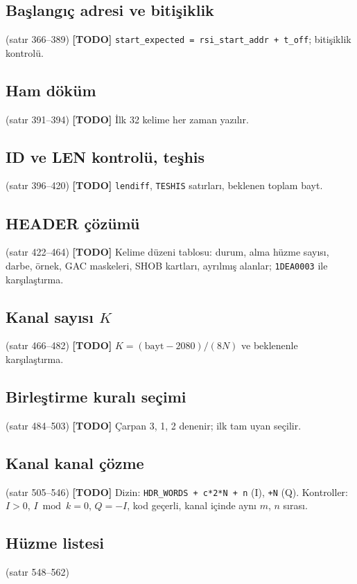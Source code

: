 \documentclass[11pt,a4paper]{article}
\newcommand{\kod}[1]{\texttt{#1}}
\newcommand{\todo}[1]{\textcolor{red!60!black}{\textbf{[TODO]} #1}}
\newcommand{\satir}[1]{\textcolor{black!60}{\scriptsize(satır #1)}}
\begin{document}
\subsection{Başlangıç adresi ve bitişiklik}
\satir{366--389} \todo{\kod{start\_expected = rsi\_start\_addr + t\_off}; bitişiklik
kontrolü.}

\subsection{Ham döküm}
\satir{391--394} \todo{İlk 32 kelime her zaman yazılır.}

\subsection{ID ve LEN kontrolü, teşhis}
\satir{396--420} \todo{\kod{lendiff}, \kod{TESHIS} satırları, beklenen toplam bayt.}

\subsection{HEADER çözümü}
\satir{422--464} \todo{Kelime düzeni tablosu: durum, alma hüzme sayısı, darbe,
örnek, GAC maskeleri, SHOB kartları, ayrılmış alanlar; \kod{1DEA0003} ile karşılaştırma.}

\subsection{Kanal sayısı $K$}
\satir{466--482} \todo{$K=(\text{bayt}-2080)/(8N)$ ve beklenenle karşılaştırma.}

\subsection{Birleştirme kuralı seçimi}
\satir{484--503} \todo{Çarpan 3, 1, 2 denenir; ilk tam uyan seçilir.}

\subsection{Kanal kanal çözme}
\satir{505--546} \todo{Dizin: \kod{HDR\_WORDS + c*2*N + n} (I), \kod{+N} (Q). Kontroller:
$I>0$, $I \bmod k=0$, $Q=-I$, kod geçerli, kanal içinde aynı $m$, $n$ sırası.}

\subsection{Hüzme listesi}
\satir{548--562}
\end{document}
